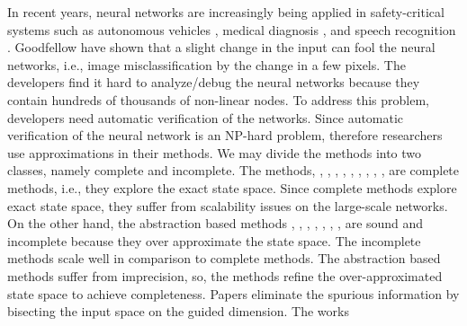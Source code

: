 










In recent years, neural networks are increasingly being applied in
safety-critical systems such as autonomous vehicles \cite{bojarski2016end},
medical diagnosis \cite{amato2013artificial}, and speech recognition \cite{hinton2012deep}.
Goodfellow \cite{goodfellow2014explaining} have shown that a slight change in the input can fool the neural networks,
i.e., image misclassification by the change in a few pixels.
The developers find it hard to analyze/debug the neural networks because they contain hundreds of thousands of non-linear nodes.
To address this problem, developers need automatic verification of the networks.
Since automatic verification of the neural network is an NP-hard problem, therefore researchers use approximations in their methods.
We may divide the methods into two classes, namely complete and incomplete.
The methods\cite{lomuscio2017approach}, \cite{fischetti2018deep},
\cite{dutta2018output}, \cite{cheng2017maximum}, \cite{katz2017reluplex}, \cite{katz2019marabou}, 
\cite{ehlers2017formal}, \cite{huang2017safety}, \cite{wang2021beta}, \cite{xu2020fast}, \cite{zhang2022general}
are complete methods, i.e., they explore the exact state space.
Since complete methods explore exact state space, they suffer from scalability issues on the large-scale networks.
On the other hand, the abstraction based methods
\cite{dvijotham2018dual}, \cite{gehr2018ai2}, \cite{singh2018fast},
 \cite{singh2018boosting}, \cite{weng2018towards}, \cite{wong2018provable}, \cite{zhang2018efficient}, \cite{zhang2018efficient}
are sound and incomplete because they over approximate the state space.
The incomplete methods scale well in comparison to complete methods. 
The abstraction based methods suffer from imprecision, so, the methods
\cite{wang2018formal,wang2018efficient,elboher2020abstraction,yang2021improving,lin2020art}
refine the over-approximated state space to achieve completeness. 
Papers \cite{wang2018formal,wang2018efficient,lin2020art} eliminate the
spurious information by bisecting the input space on the guided dimension. The \cite{yang2021improving} works
